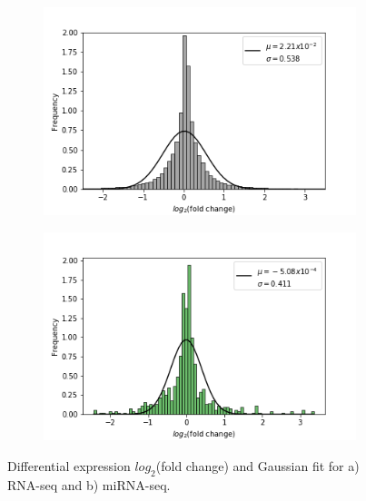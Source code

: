 \begin{figure}[h!]
     \centering
     \begin{subfigure}[b]{0.49\textwidth}
         \centering
         \includegraphics[width=\textwidth]{img/rnaDE.png}
         \caption{}
     \end{subfigure}
     \hfill
     \begin{subfigure}[b]{0.49\textwidth}
         \centering
         \includegraphics[width=\textwidth]{img/mirnaDE.png}
         \caption{}
     \end{subfigure}
        \caption{Differential expression $log_2$(fold change) and Gaussian fit for a) RNA-seq and b) miRNA-seq.}
        \label{fig:deHist}
\end{figure}
